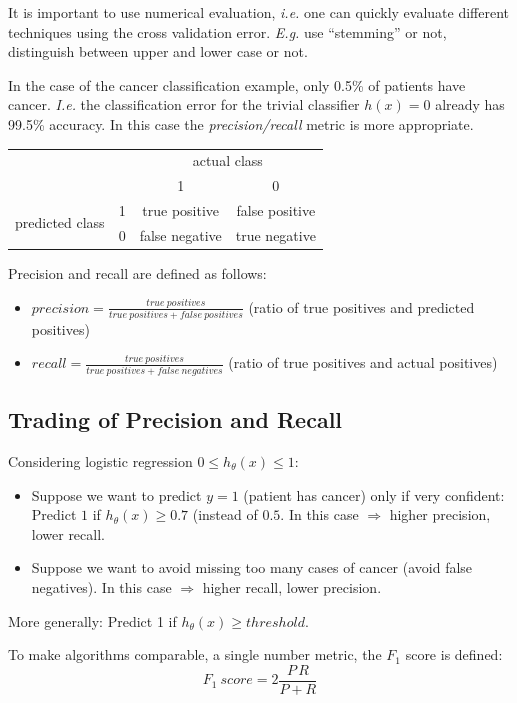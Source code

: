 \documentclass[a4paper,twoside,10pt]{article}
\begin{document}
It is important to use numerical evaluation, \emph{i.e.} one can quickly evaluate different techniques using the cross validation error. \emph{E.g.} use ``stemming'' or not, distinguish between upper and lower case or not.

In the case of the cancer classification example, only 0.5\% of patients have cancer.
\emph{I.e.} the classification error for the trivial classifier $h(x)=0$ already has 99.5\% accuracy.
In this case the \emph{precision/recall} metric is more appropriate.
\begin{center}
  \begin{tabular}{cc|cc}
    & & \multicolumn{2}{c}{actual class}\\
    &  & 1 & 0\\\hline
    \multirow{2}{*}{predicted class} & 1 & true positive & false positive\\
    & 0 & false negative & true negative\\
  \end{tabular}
\end{center}
Precision and recall are defined as follows:
\begin{itemize}
  \item $precision=\frac{true\ positives}{true\ positives+false\ positives}$ (ratio of true positives and predicted positives)
  \item $recall=\frac{true\ positives}{true\ positives+false\ negatives}$ (ratio of true positives and actual positives)
\end{itemize}

\subsection{Trading of Precision and Recall}\label{cha:f1}
Considering logistic regression $0\le h_\theta(x)\le 1$:
\begin{itemize}
  \item Suppose we want to predict $y=1$ (patient has cancer) only if very confident:
    Predict $1$ if $h_\theta(x)\ge 0.7$ (instead of $0.5$.
    In this case $\Rightarrow$ higher precision, lower recall.
  \item Suppose we want to avoid missing too many cases of cancer (avoid false negatives).
    In this case $\Rightarrow$ higher recall, lower precision.
\end{itemize}
More generally: Predict 1 if $h_\theta(x)\ge threshold$.

To make algorithms comparable, a single number metric, the $F_1$ score is defined:
\begin{equation*}
  F_1\ score=2\frac{P\,R}{P+R}
\end{equation*}
\end{document}
